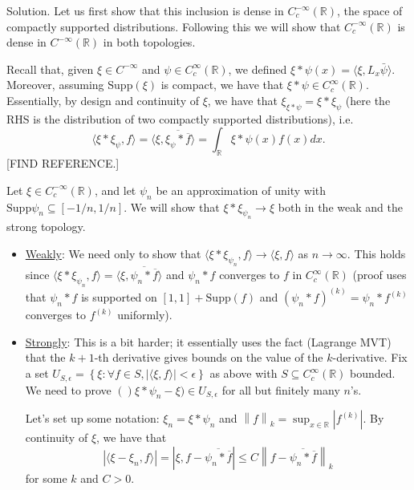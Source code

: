 \documentclass[12pt, reqno,a4paper, twoside]{amsproc}
\newcommand{\supp}{\mathrm{Supp}}
\newcommand{\dbR}{\mathbb R}
\newcommand{\gen}[1]{\langle{#1}\rangle}
\newcommand{\set}[1]{\left\{{#1}\right\}}
\newcommand{\norm}[1]{\left\|#1\right\|}
\newcommand{\abs}[1]{\left|#1\right|}
\newcommand{\widebar}{\overline}
\newenvironment{sol}{\sc Solution. \rm}{\hfill \qedsymbol\bigskip}
\begin{document}
\begin{sol}
	Let us first show that this inclusion is dense in $C_c^{-\infty}(\dbR)$, the space of compactly supported distributions. Following this we will show that $C_c^{-\infty}(\dbR)$ is dense in $C^{-\infty}(\dbR)$ in both topologies.
	
	Recall that, given $\xi\in C^{-\infty}$ and $\psi\in C_c^\infty(\dbR)$, we defined $\xi\ast \psi(x)=\gen{\xi,L_x\bar{\psi}}$. Moreover, assuming $\supp(\xi)$ is compact, we have that $\xi\ast\psi\in C_c^\infty(\dbR)$. Essentially, by design and continuity of $\xi$, we have that $\xi_{\xi\ast \psi}=\xi\ast\xi_\psi$ (here the RHS is the distribution of two compactly supported distributions), i.e.
	\[\gen{\xi\ast\xi_\psi,f}=\gen{\xi,\widebar{\xi_\psi\ast \widebar{f}}}=\int_{\dbR}\xi\ast\psi(x)f(x)dx.\]
	[FIND REFERENCE.]

	Let $\xi\in C_c^{-\infty}(\dbR)$, and let $\psi_n$ be an approximation of unity with $\supp\psi_n\subseteq [-1/n,1/n]$. We will show that $\xi\ast\xi_{\psi_n}\to \xi$ both in the weak and the strong topology.
	
	\begin{itemize}
		\item \underline{Weakly}: We need only to show that $\gen{\xi\ast\xi_{\psi_n},f}\to\gen{\xi,f}$ as $n\to \infty$. This holds since $\gen{\xi\ast\xi_{\psi_n},f}=\gen{\xi,\widebar{\psi_n\ast\widebar{f}}}$ and $\psi_n\ast f$ converges to $f$ in $C_c^\infty(\dbR)$ (proof uses that $\psi_n\ast f$ is supported on $[1,1]+\supp (f)$ and $(\psi_n\ast f)^{(k)}=\psi_n\ast f^{(k)}$ converges to $f^{(k)}$ uniformly). 
		
		\item \underline{Strongly}: This is a bit harder; it essentially uses the fact (Lagrange MVT) that the $k+1$-th derivative gives bounds on the value of the $k$-derivative. Fix a set $U_{S,\epsilon}=\set{\xi:\forall f\in S, \abs{\gen{\xi,f}}<\epsilon}$ as above with $S\subseteq C_c^{\infty}(\dbR)$ bounded. We need to prove $()\xi\ast\psi_n-\xi)\in U_{S,\epsilon}$ for all but finitely many $n$'s. 
		
		Let's set up some notation: $\xi_n=\xi\ast\psi_n$ and $\norm{f}_k=\sup_{x\in\dbR}\abs{f^{(k)}}$. By continuity of $\xi$, we have that
		\[\abs{\gen{\xi-\xi_n,f}}=\abs{\xi,f-\widebar{\psi_n\ast\widebar{f}}}\le C\norm{f-\widebar{\psi_n\ast\widebar{f}}}_k\]
		for some $k$ and $C>0$. 
		

\end{itemize}
\end{sol}
\end{document}
